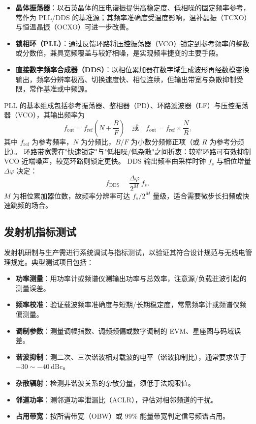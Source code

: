 \begin{itemize}
    \item \textbf{晶体振荡器}：以石英晶体的压电谐振提供高稳定度、低相噪的固定频率参考，常作为 PLL/DDS 的基准源；其频率准确度受温度影响，温补晶振（TCXO）与恒温晶振（OCXO）可进一步改善。
    \item \textbf{锁相环（PLL）}：通过反馈环路将压控振荡器（VCO）锁定到参考频率的整数或分数倍，兼具宽频覆盖与较好相噪，是实现频率捷变的主要手段。
    \item \textbf{直接数字频率合成器（DDS）}：以相位累加器在数字域生成波形再经数模变换输出，频率分辨率极高、切换速度快、相位连续，但输出带宽与杂散抑制受限，常作基准或中频源。
\end{itemize}

PLL 的基本组成包括参考振荡器、鉴相器（PD）、环路滤波器（LF）与压控振荡器（VCO），其输出频率为
\begin{equation}
f_{\mathrm{out}} = f_{\mathrm{ref}}\left(N+\frac{B}{F}\right) \quad\text{或}\quad f_{\mathrm{out}} = f_{\mathrm{ref}}\times\frac{N}{R},
\end{equation}
其中 $f_{\mathrm{ref}}$ 为参考频率，$N$ 为分频比，$B/F$ 为小数分频修正项（或 $R$ 为参考分频比）。
环路带宽需在"快速锁定"与"低相噪/低杂散"之间折衷：较窄环路可有效抑制 VCO 近端噪声，较宽环路则锁定更快。
DDS 输出频率由采样时钟 $f_s$ 与相位增量 $\Delta\varphi$ 决定：
\begin{equation}
f_{\mathrm{DDS}} = \frac{\Delta\varphi}{2^{M}}\,f_s,
\end{equation}
$M$ 为相位累加器位数，故频率分辨率可达 $f_s/2^{M}$ 量级，适合需要微步长扫频或快速跳频的场合。

\subsection{发射机指标测试}

发射机研制与生产需进行系统调试与指标测试，以验证其符合设计规范与无线电管理规定。典型测试项目包括：

\begin{itemize}
    \item \textbf{功率测量}：用功率计或频谱仪测输出功率与总效率，注意源/负载驻波引起的测量误差。
    \item \textbf{频率校准}：验证载波频率准确度与短期/长期稳定度，常需频率计或频谱仪频偏测量。
    \item \textbf{调制参数}：测量调幅指数、调频频偏或数字调制的 EVM、星座图与码域误差。
    \item \textbf{谐波抑制}：测二次、三次谐波相对载波的电平（谐波抑制比），通常要求优于 $-30\sim -40\ \mathrm{dBc}$。
    \item \textbf{杂散辐射}：检测非谐波关系的杂散分量，须低于法规限值。
    \item \textbf{邻道功率}：测邻道功率泄漏比（ACLR），评估对相邻频道的干扰。
    \item \textbf{占用带宽}：按所需带宽（OBW）或 $99\%$ 能量带宽判定信号频谱占用。
\end{itemize}


